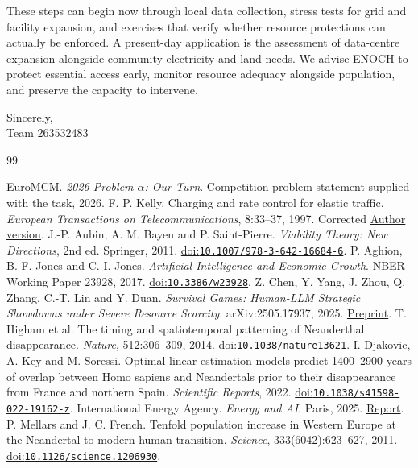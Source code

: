 \documentclass[12pt,a4paper]{article}
\theoremstyle{remark}
\newcommand{\TeamNumber}{263532483} %
\begin{document}
These steps can begin now through local data collection, stress tests for grid
and facility expansion, and exercises that verify whether resource protections
can actually be enforced. 
A present-day application is the assessment of data-centre expansion alongside community electricity and land needs. We advise ENOCH to protect essential access early, monitor resource adequacy alongside population, and preserve the capacity to intervene.

\medskip

Sincerely,\\
Team \TeamNumber

\clearpage
\begin{thebibliography}{99}
\setlength{\itemsep}{0pt}
\setlength{\parsep}{0pt}
\setlength{\parskip}{0pt}
 EuroMCM. \emph{2026 Problem $\alpha$: Our Turn}. Competition problem statement supplied with the task, 2026.
 F. P. Kelly. Charging and rate control for elastic traffic. \emph{European Transactions on Telecommunications}, 8:33--37, 1997. Corrected \href{https://www.statslab.cam.ac.uk/~fpk1/elastic.html}{Author version}.
 J.-P. Aubin, A. M. Bayen and P. Saint-Pierre. \emph{Viability Theory: New Directions}, 2nd ed. Springer, 2011. \href{https://doi.org/10.1007/978-3-642-16684-6}{doi:\nolinkurl{10.1007/978-3-642-16684-6}}.
 P. Aghion, B. F. Jones and C. I. Jones. \emph{Artificial Intelligence and Economic Growth}. NBER Working Paper 23928, 2017. \href{https://doi.org/10.3386/w23928}{doi:\nolinkurl{10.3386/w23928}}.
 Z. Chen, Y. Yang, J. Zhou, Q. Zhang, C.-T. Lin and Y. Duan. \emph{Survival Games: Human-LLM Strategic Showdowns under Severe Resource Scarcity}. arXiv:2505.17937, 2025. \href{https://arxiv.org/abs/2505.17937}{Preprint}.
 T. Higham et al. The timing and spatiotemporal patterning of Neanderthal disappearance. \emph{Nature}, 512:306--309, 2014. \href{https://doi.org/10.1038/nature13621}{doi:\nolinkurl{10.1038/nature13621}}.
 I. Djakovic, A. Key and M. Soressi. Optimal linear estimation models predict 1400--2900 years of overlap between Homo sapiens and Neandertals prior to their disappearance from France and northern Spain. \emph{Scientific Reports}, 2022. \href{https://doi.org/10.1038/s41598-022-19162-z}{doi:\nolinkurl{10.1038/s41598-022-19162-z}}.
 International Energy Agency. \emph{Energy and AI}. Paris, 2025. \href{https://www.iea.org/reports/energy-and-ai/energy-demand-from-ai}{Report}.
 P. Mellars and J. C. French. Tenfold population increase in Western Europe at the Neandertal-to-modern human transition. \emph{Science}, 333(6042):623--627, 2011. \href{https://doi.org/10.1126/science.1206930}{doi:\nolinkurl{10.1126/science.1206930}}.

\end{thebibliography}
\end{document}
